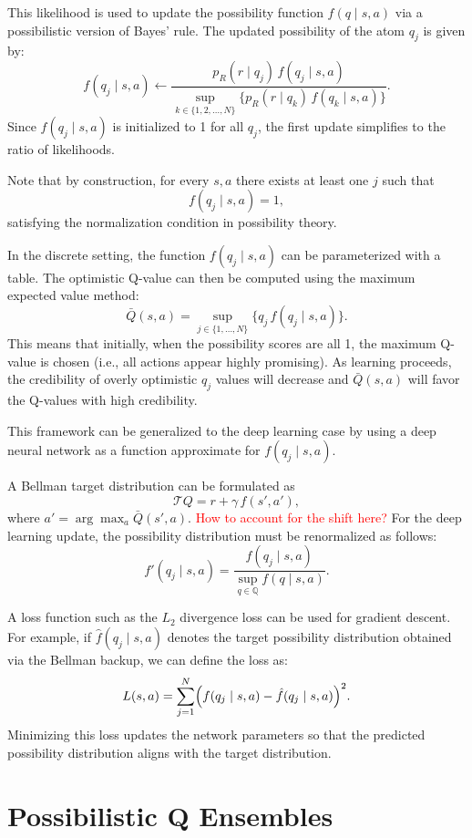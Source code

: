 \documentclass[12pt,a4paper]{report}
\newcommand\myworries[1]{\textcolor{red}{#1}}
\begin{document}
This likelihood is used to update the possibility function \( f(q \mid s, a) \) via a possibilistic version of Bayes' rule. The updated possibility of the atom \(q_j\) is given by:
\[
f(q_j \mid s, a) \leftarrow \frac{p_R(r \mid q_j)\, f(q_j \mid s, a)}{\displaystyle \sup_{k \in \{1, 2, \dots, N\}} \bigl\{p_R(r \mid q_k)\, f(q_k \mid s, a)\bigr\}}.
\]
Since \( f(q_j \mid s, a) \) is initialized to 1 for all \(q_j\), the first update simplifies to the ratio of likelihoods.

Note that by construction, for every \(s,a\) there exists at least one \(j\) such that 
\[
f(q_j \mid s, a) = 1,
\]
satisfying the normalization condition in possibility theory.

In the discrete setting, the function \( f(q_j \mid s, a) \) can be parameterized with a table. The optimistic Q-value can then be computed using the maximum expected value method:
\[
\bar{Q}(s, a) = \sup_{j \in \{1, \dots, N\}} \{q_j\, f(q_j \mid s, a)\}.
\]
This means that initially, when the possibility scores are all 1, the maximum Q-value is chosen (i.e., all actions appear highly promising). As learning proceeds, the credibility of overly optimistic \(q_j\) values will decrease and \(\bar{Q}(s,a)\) will favor the Q-values with high credibility.

This framework can be generalized to the deep learning case by using a deep neural network as a function approximate for \( f(q_j \mid s, a) \).

A Bellman target distribution can be formulated as
\[
\mathcal{T}Q = r + \gamma\, f(s', a'),
\]
where \( a' = \arg\max_{a} \bar{Q}(s',a) \). \myworries{How to account for the shift here?} For the deep learning update, the possibility distribution must be renormalized as follows:
\[
f'(q_j \mid s, a ) = \frac{f(q_j \mid s, a)}{\displaystyle \sup_{q \in \mathbb{Q}} f(q \mid s, a)}.
\]

A loss function such as the \(L_2\) divergence loss can be used for gradient descent. For example, if \(\hat{f}(q_j \mid s, a)\) denotes the target possibility distribution obtained via the Bellman backup, we can define the loss as:
\[
L(s,a) = \sum_{j=1}^{N} \Bigl( f(q_j \mid s, a) - \hat{f}(q_j \mid s, a) \Bigr)^2.
\]
Minimizing this loss updates the network parameters so that the predicted possibility distribution aligns with the target distribution.

\chapter{Possibilistic Q Ensembles}
\end{document}
